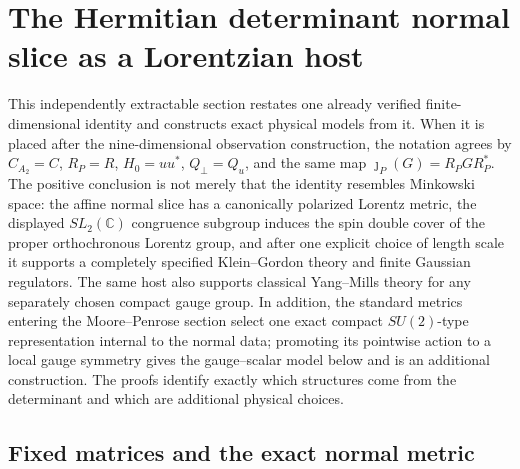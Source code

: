 \section{The Hermitian determinant normal slice as a Lorentzian host}
\label{hnsp-section}

This independently extractable section restates one already verified
finite-dimensional identity and constructs exact physical models from it.
When it is placed after the nine-dimensional observation construction, the
notation agrees by
\(C_{A_2}=C\), \(R_P=R\), \(H_0=uu^*\),
\(Q_\perp=Q_u\), and the same map
\(\jmath_P(G)=R_PGR_P^*\).  The positive conclusion is not
merely that the identity resembles Minkowski space: the affine normal slice
has a canonically polarized Lorentz metric, the displayed \(SL_2(\mathbb C)\)
congruence subgroup induces the spin double cover of the proper orthochronous
Lorentz group, and after one explicit choice of length scale it supports a completely
specified Klein--Gordon theory and finite Gaussian regulators.  The same host
also supports classical Yang--Mills theory for any separately chosen compact
gauge group.  In addition, the standard metrics entering the Moore--Penrose
section select one exact compact \(SU(2)\)-type representation internal to the
normal data; promoting its pointwise action to a local gauge symmetry gives
the gauge--scalar model below and is an additional construction.  The proofs
identify exactly which structures come from the determinant and which are
additional physical choices.

\subsection{Fixed matrices and the exact normal metric}

